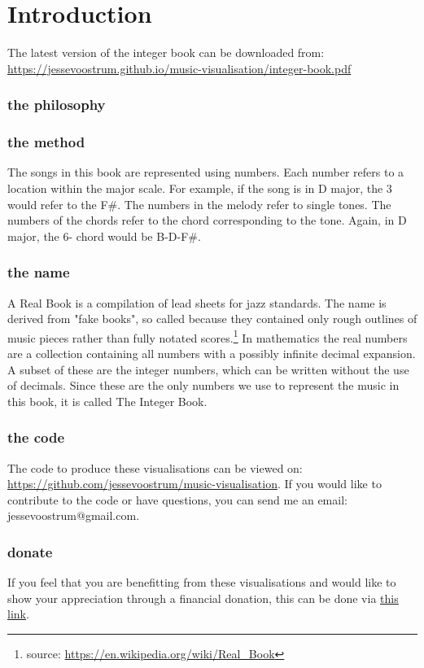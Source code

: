 \section*{Introduction}

\sffamily

The latest version of the integer book can be downloaded from: \url{https://jessevoostrum.github.io/music-visualisation/integer-book.pdf}

\subsubsection*{the philosophy}


\subsubsection*{the method}
The songs in this book are represented using numbers. Each number refers to a location within the major scale. For example, if the song is in D major, the 3 would refer to the F\#. The numbers in the melody refer to single tones. The numbers of the chords refer to the chord corresponding to the tone. Again, in D major, the 6- chord would be B-D-F\#.  

\subsubsection*{the name}
A Real Book is a compilation of lead sheets for jazz standards. The name is derived from "fake books", so called because they contained only rough outlines of music pieces rather than fully notated scores.\footnote{source: \url{https://en.wikipedia.org/wiki/Real_Book}} In mathematics the real numbers are a collection containing all numbers with a possibly infinite decimal expansion. A subset of these are the integer numbers, which can be written without the use of decimals. Since these are the only numbers we use to represent the music in this book, it is called The Integer Book.

\subsubsection*{the code}
The code to produce these visualisations can be viewed on: \url{https://github.com/jessevoostrum/music-visualisation}. If you would like to contribute to the code or have questions, you can send me an email: jessevoostrum@gmail.com.

\subsubsection*{donate}
If you feel that you are benefitting from these visualisations and would like to show your appreciation through a financial donation, this can be done via \href{https://www.paypal.com/cgi-bin/webscr?cmd=_donations&business=jessevoostrum@gmail.com&no_shipping=1&no_note=1&tax=0&currency_code=EUR&lc=US&bn=PP_DonationsBF}{\underline{this link}}. 
